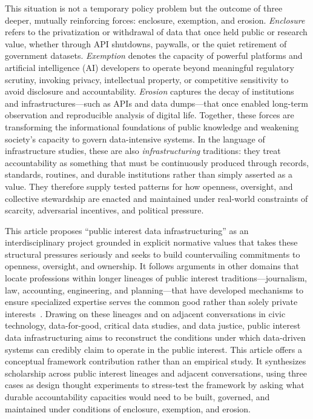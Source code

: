 \documentclass[acmsmall,screen]{acmart}
\begin{document}
This situation is not a temporary policy problem but the outcome of three deeper, mutually reinforcing forces: enclosure, exemption, and erosion. \textit{Enclosure} refers to the privatization or withdrawal of data that once held public or research value, whether through API shutdowns, paywalls, or the quiet retirement of government datasets. \textit{Exemption} denotes the capacity of powerful platforms and artificial intelligence (AI) developers to operate beyond meaningful regulatory scrutiny, invoking privacy, intellectual property, or competitive sensitivity to avoid disclosure and accountability. \textit{Erosion} captures the decay of institutions and infrastructures---such as APIs and data dumps---that once enabled long-term observation and reproducible analysis of digital life. Together, these forces are transforming the informational foundations of public knowledge and weakening society's capacity to govern data-intensive systems. In the language of infrastructure studies, these are also \textit{infrastructuring} traditions: they treat accountability as something that must be continuously produced through records, standards, routines, and durable institutions rather than simply asserted as a value. They therefore supply tested patterns for how openness, oversight, and collective stewardship are enacted and maintained under real-world constraints of scarcity, adversarial incentives, and political pressure.

This article proposes ``public interest data infrastructuring'' as an interdisciplinary project grounded in explicit normative values that takes these structural pressures seriously and seeks to build countervailing commitments to openness, oversight, and ownership. It follows arguments in other domains that locate professions within longer lineages of public interest traditions---journalism, law, accounting, engineering, and planning---that have developed mechanisms to ensure specialized expertise serves the common good rather than solely private interests~\cite{washingtonDefiningPublicInterest2024}. Drawing on these lineages and on adjacent conversations in civic technology, data-for-good, critical data studies, and data justice, public interest data infrastructuring aims to reconstruct the conditions under which data-driven systems can credibly claim to operate in the public interest. This article offers a conceptual framework contribution rather than an empirical study. It synthesizes scholarship across public interest lineages and adjacent conversations, using three cases as design thought experiments to stress-test the framework by asking what durable accountability capacities would need to be built, governed, and maintained under conditions of enclosure, exemption, and erosion.
\end{document}
